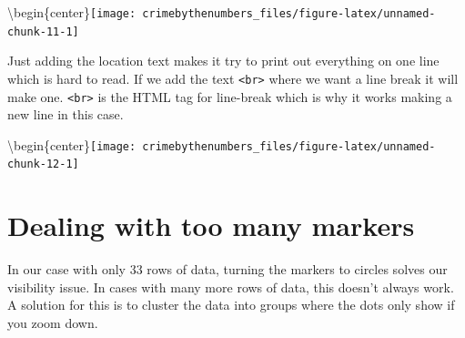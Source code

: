 \documentclass[
  12pt,
]{book}
\newenvironment{Shaded}{\begin{snugshade}}{\end{snugshade}}
\newcommand{\DataTypeTok}[1]{\textcolor[rgb]{0.27,0.27,0.27}{#1}}
\newcommand{\DecValTok}[1]{\textcolor[rgb]{0.06,0.06,0.06}{#1}}
\newcommand{\KeywordTok}[1]{\textcolor[rgb]{0.27,0.27,0.27}{\textbf{#1}}}
\newcommand{\NormalTok}[1]{#1}
\newcommand{\OperatorTok}[1]{\textcolor[rgb]{0.43,0.43,0.43}{\textbf{#1}}}
\newcommand{\StringTok}[1]{\textcolor[rgb]{0.5,0.5,0.5}{#1}}
\begin{document}
\textbackslash begin\{center\}\texttt{[image: crimebythenumbers\_files/figure-latex/unnamed-chunk-11-1]}

Just adding the location text makes it try to print out everything on one line which is hard to read. If we add the text \texttt{\textless{}br\textgreater{}} where we want a line break it will make one. \texttt{\textless{}br\textgreater{}} is the HTML tag for line-break which is why it works making a new line in this case.

\begin{Shaded}
\end{Shaded}

\textbackslash begin\{center\}\texttt{[image: crimebythenumbers\_files/figure-latex/unnamed-chunk-12-1]}

\hypertarget{dealing-with-too-many-markers}{%
\section{Dealing with too many markers}\label{dealing-with-too-many-markers}}

In our case with only 33 rows of data, turning the markers to circles solves our visibility issue. In cases with many more rows of data, this doesn't always work. A solution for this is to cluster the data into groups where the dots only show if you zoom down.
\end{document}
